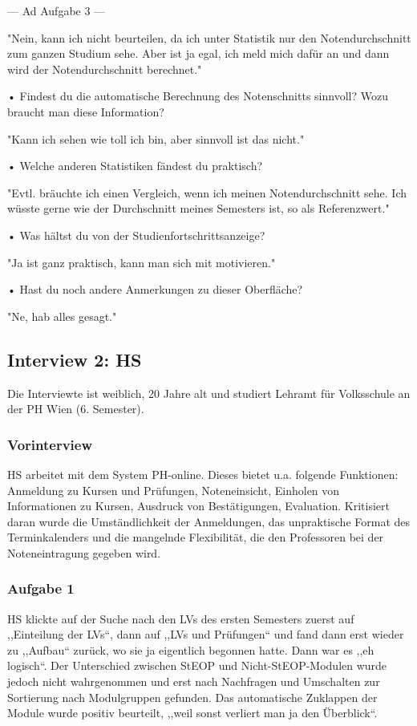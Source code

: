 \documentclass[a4paper,10pt]{scrartcl}
\begin{document}
---
Ad Aufgabe 3
---

"Nein, kann ich nicht beurteilen, da ich unter Statistik nur den Notendurchschnitt zum ganzen Studium sehe. Aber ist ja egal, ich meld mich dafür an und dann wird der Notendurchschnitt berechnet."

• Findest du die automatische Berechnung des Notenschnitts sinnvoll? Wozu braucht
man diese Information?

"Kann ich sehen wie toll ich bin, aber sinnvoll ist das nicht."


• Welche anderen Statistiken fändest du praktisch?

"Evtl. bräuchte ich einen Vergleich, wenn ich meinen Notendurchschnitt sehe. Ich wüsste gerne wie der Durchschnitt meines Semesters ist, so als Referenzwert."


• Was hältst du von der Studienfortschrittsanzeige?

"Ja ist ganz praktisch, kann man sich mit motivieren."


• Hast du noch andere Anmerkungen zu dieser Oberfläche? 

"Ne, hab alles gesagt."

\subsection*{Interview 2: HS}

Die Interviewte ist weiblich, 20 Jahre alt und studiert Lehramt für Volksschule an der PH Wien (6. Semester).

\subsubsection*{Vorinterview}

HS arbeitet mit dem System PH-online. Dieses bietet u.a. folgende Funktionen: Anmeldung zu Kursen und Prüfungen, Noteneinsicht, Einholen von Informationen zu Kursen, Ausdruck von Bestätigungen, Evaluation. Kritisiert daran wurde die Umständlichkeit der Anmeldungen, das unpraktische Format des Terminkalenders und die mangelnde Flexibilität, die den Professoren bei der Noteneintragung gegeben wird.

\subsubsection*{Aufgabe 1}

HS klickte auf der Suche nach den LVs des ersten Semesters zuerst auf ,,Einteilung der LVs``, dann auf ,,LVs und Prüfungen`` und fand dann erst wieder zu ,,Aufbau`` zurück, wo sie ja eigentlich begonnen hatte. Dann war es ,,eh logisch``. Der Unterschied zwischen StEOP und Nicht-StEOP-Modulen wurde jedoch nicht wahrgenommen und erst nach Nachfragen und Umschalten zur Sortierung nach Modulgruppen gefunden. Das automatische Zuklappen der Module wurde positiv beurteilt, ,,weil sonst verliert man ja den Überblick``.
\end{document}
